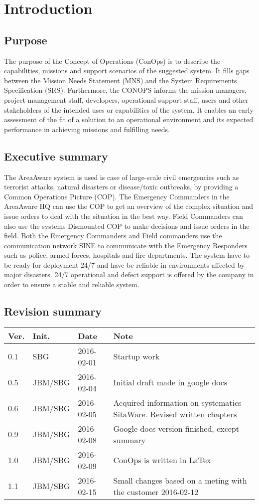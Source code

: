 \chapter{Introduction}
\label{chp_intro}

\section{Purpose}
The purpose of the Concept of Operations (ConOps) is to describe the capabilities, missions and support scenarios of the suggested system. It fills gaps between the Mission Needs Statement (MNS) and the System Requirements Specification (SRS).
Furthermore, the CONOPS informs the mission managers, project management staff, developers, operational support staff, users and other stakeholders of the intended uses or capabilities of the system. It enables an early assessment of the fit of a solution to an operational environment and its expected performance in achieving missions and fulfilling needs.

\section{Executive summary}
The AreaAware system is used is case of large-scale civil emergencies such as terrorist attacks, natural disasters or disease/toxic outbreaks, by providing a Common Operations Picture (COP). The Emergency Commanders in the AreaAware HQ can use the COP to get an overview of the complex situation and issue orders to deal with the situation in the best way. Field Commanders can also use the systems Dismounted COP to make decisions and issue orders in the field. Both the Emergency Commanders and Field commanders use the communication network SINE to communicate with the Emergency Responders such as police, armed forces, hospitals and fire departments. The system have to be ready for deployment 24/7 and have be reliable in environments affected by major disasters. 24/7 operational and defect support is offered by the company in order to ensure a stable and reliable system.

\section{Revision summary}

\begin{tabular}{b{1cm} b{2cm} b{2cm} b{7cm}}
    \textbf{Ver.} & \textbf{Init.} & \textbf{Date} & \textbf{Note} \\
    \hline
    0.1  & SBG		& 2016-02-01 & Startup work \\
    0.5  & JBM/SBG	& 2016-02-04 & Initial draft made in google docs \\
    0.6  & JBM/SBG	& 2016-02-05 & Acquired information on systematics SitaWare. Revised written chapters \\
    0.9  & JBM/SBG	& 2016-02-08 & Google docs version finished, except summary \\
    1.0  & JBM/SBG	& 2016-02-09 & ConOps is written in LaTex \\
    1.1  & JBM/SBG	& 2016-02-15 & Small changes based on a meting with the customer 2016-02-12\\
\end{tabular}